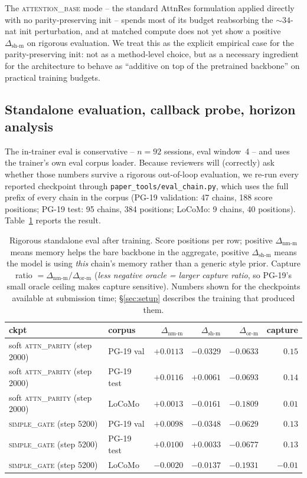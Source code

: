 \documentclass{article}
\newcommand{\dnm}{\Delta_{\text{nm-m}}}
\newcommand{\dsh}{\Delta_{\text{sh-m}}}
\newcommand{\dor}{\Delta_{\text{or-m}}}
\begin{document}
The \textsc{attention\_base} mode -- the standard AttnRes formulation
applied directly with no parity-preserving init -- spends most of its
budget reabsorbing the $\sim 34$-nat init perturbation, and at
matched compute does not yet show a positive $\dsh$ on rigorous
evaluation. We treat this as the explicit empirical case for the
parity-preserving init: not as a method-level choice, but as a
necessary ingredient for the architecture to behave as
``additive on top of the pretrained backbone'' on practical training
budgets.

\subsection{Standalone evaluation, callback probe, horizon analysis}
\label{sec:diagnostics}

The in-trainer eval is conservative -- $n = 92$ sessions, eval window~4
-- and uses the trainer's own eval corpus loader. Because reviewers
will (correctly) ask whether those numbers survive a rigorous
out-of-loop evaluation, we re-run every reported checkpoint through
\texttt{paper\_tools/eval\_chain.py}, which uses the full
prefix of every chain in the corpus (PG-19 validation: 47 chains,
188 score positions; PG-19 test: 95 chains, 384 positions; LoCoMo:
9 chains, 40 positions). Table~\ref{tab:standalone} reports the
result.

\begin{table}[t]
\centering
\caption{Rigorous standalone eval after training. Score positions
per row; positive $\dnm$ means memory helps the bare backbone in the
aggregate, positive $\dsh$ means the model is using \emph{this} chain's
memory rather than a generic style prior. Capture ratio $= \dnm / \dor$
(\textit{less negative oracle = larger capture ratio}, so PG-19's small
oracle ceiling makes capture sensitive). Numbers shown for the
checkpoints available at submission time; \S\ref{sec:setup} describes
the training that produced them.}
\label{tab:standalone}
\small
\begin{tabular}{llrrrr}
\toprule
ckpt & corpus & $\dnm$ & $\dsh$ & $\dor$ & capture \\
\midrule
  soft \textsc{attn\_parity} (step 2000) & PG-19 val & $+0.0113$ & $-0.0329$ & $-0.0633$ & $0.15$ \\
  soft \textsc{attn\_parity} (step 2000) & PG-19 test & $+0.0116$ & $+0.0061$ & $-0.0693$ & $0.14$ \\
  soft \textsc{attn\_parity} (step 2000) & LoCoMo & $+0.0013$ & $-0.0161$ & $-0.1809$ & $0.01$ \\
  \midrule
  \textsc{simple\_gate} (step 5200) & PG-19 val & $+0.0098$ & $-0.0348$ & $-0.0629$ & $0.13$ \\
  \textsc{simple\_gate} (step 5200) & PG-19 test & $+0.0100$ & $+0.0033$ & $-0.0677$ & $0.13$ \\
  \textsc{simple\_gate} (step 5200) & LoCoMo & $-0.0020$ & $-0.0137$ & $-0.1931$ & $-0.01$ \\
\bottomrule
\end{tabular}
\end{table}
\end{document}
